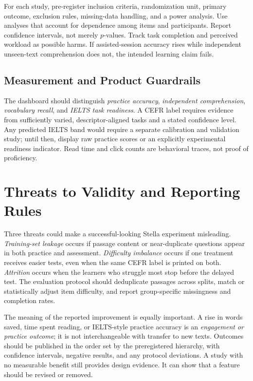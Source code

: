 \documentclass[conference,10pt]{IEEEtran}
\begin{document}
For each study, pre-register inclusion criteria, randomization unit, primary outcome, exclusion rules, missing-data handling, and a power analysis. Use analyses that account for dependence among items and participants. Report confidence intervals, not merely $p$-values. Track task completion and perceived workload as possible harms. If assisted-session accuracy rises while independent unseen-text comprehension does not, the intended learning claim fails.

\subsection{Measurement and Product Guardrails}
The dashboard should distinguish \emph{practice accuracy}, \emph{independent comprehension}, \emph{vocabulary recall}, and \emph{IELTS task readiness}. A CEFR label requires evidence from sufficiently varied, descriptor-aligned tasks and a stated confidence level. Any predicted IELTS band would require a separate calibration and validation study; until then, display raw practice scores or an explicitly experimental readiness indicator. Read time and click counts are behavioral traces, not proof of proficiency.


\section{Threats to Validity and Reporting Rules}
Three threats could make a successful-looking Stella experiment misleading. \emph{Training-set leakage} occurs if passage content or near-duplicate questions appear in both practice and assessment. \emph{Difficulty imbalance} occurs if one treatment receives easier tests, even when the same CEFR label is printed on both. \emph{Attrition} occurs when the learners who struggle most stop before the delayed test. The evaluation protocol should deduplicate passages across splits, match or statistically adjust item difficulty, and report group-specific missingness and completion rates.

The meaning of the reported improvement is equally important. A rise in words saved, time spent reading, or IELTS-style practice accuracy is an \emph{engagement or practice outcome}; it is not interchangeable with transfer to new texts. Outcomes should be published in the order set by the preregistered hierarchy, with confidence intervals, negative results, and any protocol deviations. A study with no measurable benefit still provides design evidence. It can show that a feature should be revised or removed.
\end{document}
